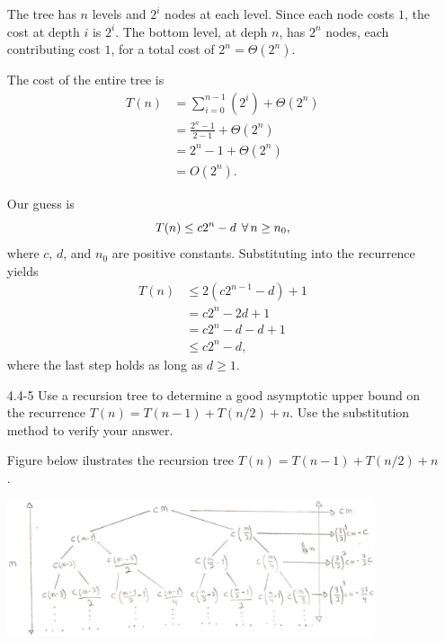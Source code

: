 \begin{enumerate}
\begin{framed}
The tree has $n$ levels and $2^i$ nodes at each level. Since each node costs
$1$, the cost at depth $i$ is $2^i$. The bottom level, at deph $n$,
has $2^n$ nodes, each contributing cost $1$, for a total
cost of $2^n = \Theta(2^n)$.

The cost of the entire tree is
\begin{equation*}
\begin{aligned}
  T(n) &= \sum_{i = 0}^{n - 1} (2^i) + \Theta(2^n)\\
       &= \frac{2^n - 1}{2 - 1} + \Theta(2^n)\\
       &= 2^n - 1 + \Theta(2^n)\\
       &= O(2^n).
\end{aligned}
\end{equation*}

Our guess is
\[
T(n) \le c 2^n - d \; \operatorname{\forall} n \ge n_0,
\]
where $c$, $d$, and $n_0$ are positive constants. Substituting into the
recurrence yields
\begin{equation*}
\begin{aligned}
  T(n) &\le 2 (c 2^{n - 1} - d) + 1\\
       &= c2^n - 2d + 1\\
       &= c2^n - d - d + 1\\
       &\le c 2^n - d,
\end{aligned}
\end{equation*}
where the last step holds as long as $d \ge 1$.
\end{framed}

\newpage

\item[4.4{-}5]{Use a recursion tree to determine a good asymptotic upper bound
on the recurrence $T(n) = T(n - 1) + T(n/2) + n$. Use the substitution method to
verify your answer.}

\begin{framed}
Figure below ilustrates the recursion tree $T(n) = T(n - 1) + T(n/2) + n$.

\begin{center}
\includegraphics[width=0.85\textwidth]{images/4_4_5_1.pdf}
\end{center}


\end{framed}
\end{enumerate}
